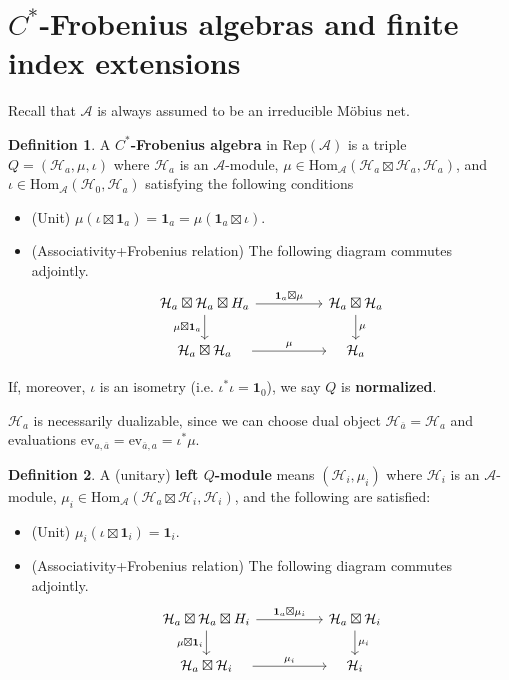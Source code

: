 \documentclass[12pt,a4paper,notitlepage]{article}
\theoremstyle{definition}
\newtheorem{df}{Definition}[section]
\theoremstyle{plain}
\newcommand{\mc}{\mathcal}
\newcommand{\ovl}{\overline}
\newcommand{\id}{\mathbf{1}}
\newcommand{\Hom}{\mathrm{Hom}}
\newcommand{\ev}{\mathrm{ev}}
\newcommand{\RepA}{\mathrm{Rep}(\mathcal A)}
\numberwithin{equation}{section}
\begin{document}
	
\section{$C^*$-Frobenius algebras and finite index extensions}	


Recall that  $\mc A$ is always assumed to be an irreducible M\"obius net.

\begin{df}
	A \textbf{$C^*$-Frobenius algebra} in $\RepA$ is a triple $Q=(\mc H_a,\mu,\iota)$ where $\mc H_a$ is an $\mc A$-module, $\mu\in\Hom_{\mc A}(\mc H_a\boxtimes\mc H_a,\mc H_a)$, and $\iota\in\Hom_{\mc A}(\mc H_0,\mc H_a)$  satisfying the following conditions
	\begin{itemize}
		\item (Unit) $\mu(\iota\boxtimes\id_a)=\id_a=\mu(\id_a\boxtimes\iota)$.
		\item (Associativity+Frobenius relation) The following diagram commutes adjointly.
		\begin{equation}
			\begin{tikzcd}
				\mc H_a\boxtimes\mc H_a\boxtimes H_a\arrow[rr,"\id_a\boxtimes\mu"]\arrow[d,"\mu\boxtimes\id_a"'] && \mc H_a\boxtimes\mc H_a\arrow[d,"\mu"]\\
				\quad\mc H_a\boxtimes\mc H_a\quad\arrow[rr,"\mu"] && \quad\mc H_a\quad
			\end{tikzcd}	
		\end{equation} 
	\end{itemize}
	If, moreover, $\iota$ is an isometry (i.e. $\iota^*\iota=\id_0$), we say $Q$ is \textbf{normalized}.
\end{df}


$\mc H_a$ is necessarily dualizable, since we can choose dual object $\mc H_{\ovl a}=\mc H_a$ and evaluations $\ev_{a,\ovl a}=\ev_{\ovl a,a}=\iota^*\mu$.


\begin{df}
	A (unitary) \textbf{left $Q$-module} means $(\mc H_i,\mu_i)$ where $\mc H_i$ is an $\mc A$-module, $\mu_i\in\Hom_{\mc A}(\mc H_a\boxtimes\mc H_i,\mc H_i)$, and the following are satisfied:	
	\begin{itemize}
		\item (Unit) $\mu_i(\iota\boxtimes\id_i)=\id_i$.
		\item (Associativity+Frobenius relation) The following diagram commutes adjointly.
		\begin{equation}\label{eq3}
			\begin{tikzcd}
				\mc H_a\boxtimes\mc H_a\boxtimes H_i\arrow[rr,"\id_a\boxtimes\mu_i"]\arrow[d,"\mu\boxtimes\id_i"'] && \mc H_a\boxtimes\mc H_i\arrow[d,"\mu_i"]\\
				\quad\mc H_a\boxtimes\mc H_i\quad\arrow[rr,"\mu_i"] && \quad\mc H_i\quad
			\end{tikzcd}	
		\end{equation} 
	\end{itemize}	
\end{df}	
\end{document}
